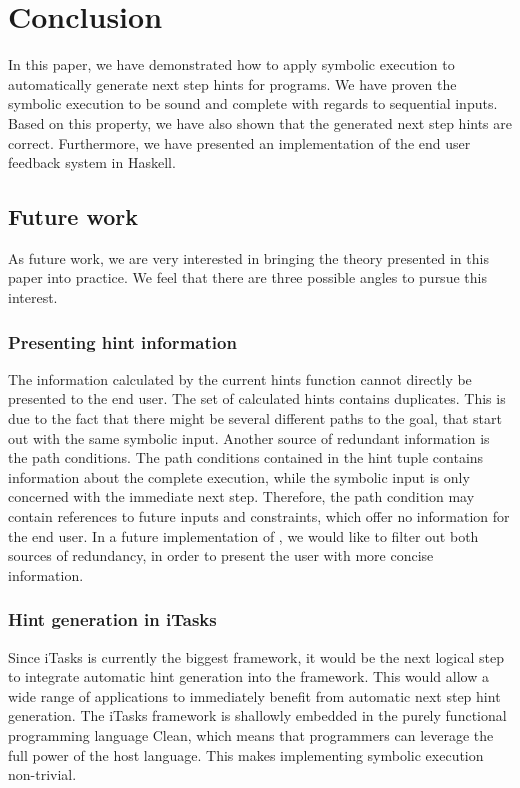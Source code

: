 
\section{Conclusion}
\label{sec:conclusion}

In this paper, we have demonstrated how to apply symbolic execution to automatically generate next step hints for \TOPHAT programs.
We have proven the symbolic execution to be sound and complete with regards to sequential inputs.
Based on this property, we have also shown that the generated next step hints are correct.
Furthermore, we have presented an implementation of the end user feedback system in Haskell.


\subsection{Future work}

As future work, we are very interested in bringing the theory presented in this paper into practice.
We feel that there are three possible angles to pursue this interest.

\subsubsection{Presenting hint information}
The information calculated by the current hints function cannot directly be presented to the end user.
The set of calculated hints contains duplicates.
This is due to the fact that there might be several different paths to the goal, that start out with the same symbolic input.
Another source of redundant information is the path conditions.
The path conditions contained in the hint tuple contains information about the complete execution, while the symbolic input is only concerned with the immediate next step.
Therefore, the path condition may contain references to future inputs and constraints, which offer no information for the end user.
In a future implementation of \ASTOPHAT, we would like to filter out both sources of redundancy, in order to present the user with more concise information.

\subsubsection{Hint generation in iTasks}
Since iTasks is currently the biggest \TOP framework, it would be the next logical step to integrate automatic hint generation into the framework.
This would allow a wide range of applications to immediately benefit from automatic next step hint generation.
The iTasks framework is shallowly embedded in the purely functional programming language Clean,
which means that programmers can leverage the full power of the host language.
This makes implementing symbolic execution non-trivial.


